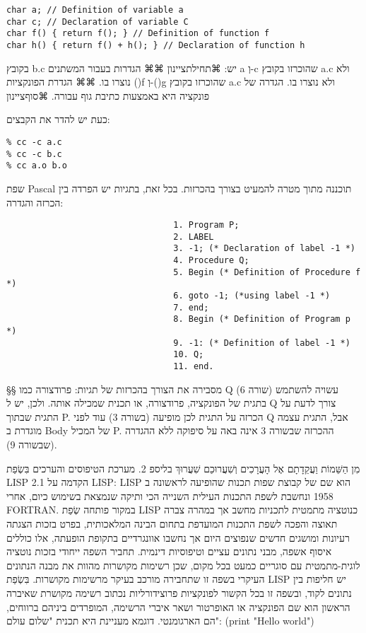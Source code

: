 \begin{verbatim}
char a; // Definition of variable a
char c; // Declaration of variable C
char f() { return f(); } // Definition of function f
char h() { return f() + h(); } // Declaration of function h
\end{verbatim}
      בקובץ b.c יש:
      ⌘תחילת{ציינון}
      ⌘⌘ הגדרות בעבור המשתנים a וְ-c שהוכרזו בקובץ a.c ולא נוצרו בו.
      ⌘⌘ הגדרת הפונקציות ()f וְ-()g שהוכרזו בקובץ a.c ולא נוצרו בו. הגדרה של פונקציה היא באמצעות כתיבת גוף עבורה.
    ⌘סוף{ציינון}

      כעת יש להדר את הקבצים:
\begin{verbatim}
% cc -c a.c
% cc -c b.c
% cc a.o b.o
\end{verbatim}
      שפת Pascal תוכננה מתוך מטרה להמעיט בצורך בהכרזות. בכל זאת, בתגיות יש הפרדה בין הכרזה והגדרה:
\begin{verbatim}
                                 1. Program P;
                                 2. LABEL
                                 3. -1; (* Declaration of label -1 *)
                                 4. Procedure Q;
                                 5. Begin (* Definition of Procedure f *)
                                 6. goto -1; (*using label -1 *)
                                 7. end;
                                 8. Begin (* Definition of Program p *)
                                 9. -1: (* Definition of label -1 *)
                                 10. Q;
                                 11. end.
\end{verbatim}
      §§ מסבירה את הצורך בהכרזות של תגיות: פרודצורה כמו Q עשויה להשתמש (שורה 6) בתגית של הפונקציה, פרודצורה, או תכנית שמכילה אותה. ולכן, יש ל Q צורך לדעת על התגית שבתוך P.
      הכרזה על התגית לכן מופיעה (בשורה 3) עוד לפני Q אבל, התגית עצמה מוגדרת ב Body של המכיל P. ההכרזה שבשורה 3 אינה באה על סיפוקה ללא ההגדרה (שבשורה 9).

      מִן הַשֵּׁמוֹת וַעֲקֵדָתָם אֶל הָעֲרָכִים וְשִׁעֲרוּכַם
      שִׁעֲרוּךְ בליספ
      2. מערכת הטיפוסים והערכים בִּשְׂפַת LISP
      2.1 הקדמה על LISP:
      LISP הוא שם של קבוצת שפות תכנות שהופיעה לראשונה ב 1958 ונחשבת לשפת התכנות
      העילית השנייה הכי ותיקה שנמצאת בשימוש כיום, אחרי FORTRAN. במקור פותחה שְׂפַת LISP
      כנוטציה מתמטית לתכניות מחשב אך במהרה צברה תאוצה והפכה לשפת התכנות המועדפת בתחום
      הבינה המלאכותית, בפרט בזכות הצגתה רעיונות ומושגים חדשים שנפוצים היום אך נחשבו
      אוונגרדיים בתקופת הופעתה, אלו כוללים איסוף אשפה, מבני נתונים עציים וטיפוסיות
      דינמית. תחביר השפה ייחודי בזכות נוטציה לוגית-מתמטית עם סוגריים כמעט בכל מקום,
      שכן רשימות מקושרות מהוות את מבנה הנתונים העיקרי בשפה זו שתחבירה מורכב בעיקר
      מרשימות מקושרות. בִּשְׂפַת LISP יש חליפות בין נתונים לקוד, ובשפה זו בכל הקשור
      לפונקציות פרוצידורליות נכתוב רשימה מקושרת שאיברה הראשון הוא שם הפונקציה או
      האופרטור ושאר איברי הרשימה, המופרדים ביניהם ברווחים, הם הארגומנטי. דוגמא
      מעניינת היא תכנית "שלום עולם":
      (print "Hello world")

